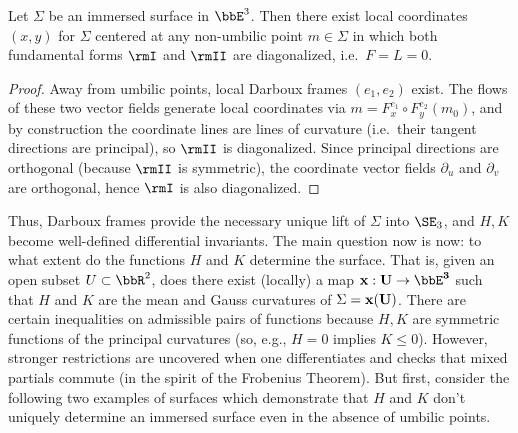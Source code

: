 \begin{lem}\label{lem line of curvature coordinates}
    Let $\Sigma$ be an immersed surface in $\bbE^3$. Then there exist local coordinates $(x,y)$ for $\Sigma$ centered at any non-umbilic point $m\in\Sigma$ in which both fundamental forms $\rmI$ and $\rmII$ are diagonalized, i.e.\ $F=L=0$. 
\end{lem}
\begin{proof}
    Away from umbilic points, local Darboux frames $(e_1,e_2)$ exist. The flows of these two vector fields generate local coordinates via $m=F^{e_1}_x\circ F^{e_2}_y(m_0)$, and by construction the coordinate lines are lines of curvature (i.e.\ their tangent directions are principal), so $\rmII$ is diagonalized. Since principal directions are orthogonal (because $\rmII$ is symmetric), the coordinate vector fields $\partial_u$ and $\partial_v$ are orthogonal, hence $\rmI$ is also diagonalized.
\end{proof}

Thus, Darboux frames provide the necessary unique lift of $\Sigma$ into $\SE_3$, and $H,K$ become well-defined differential invariants. The main question now is now: to what extent do the functions $H$ and $K$ determine the surface. That is, given an open subset $U\subset\bbR^2$, does there exist (locally) a map $\bf{x}:U\to \bbE^3$ such that $H$ and $K$ are the mean and Gauss curvatures of $\Sigma=\bf{x}(U)$. There are certain inequalities on admissible pairs of functions because $H,K$ are symmetric functions of the principal curvatures (so, e.g., $H=0$ implies $K\leq 0$). However, stronger restrictions are uncovered when one differentiates and checks that mixed partials commute (in the spirit of the Frobenius Theorem). But first, consider the following two examples of surfaces which demonstrate that $H$ and $K$ don't uniquely determine an immersed surface even in the absence of umbilic points.

